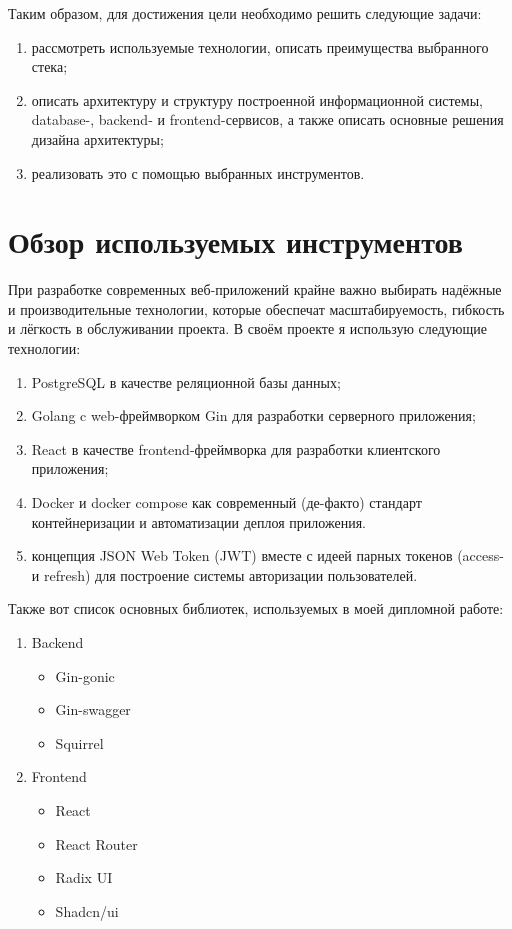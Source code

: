 \documentclass[diploma]{SCWorks}
\begin{document}
Таким образом, для достижения цели необходимо решить следующие задачи:
\begin{enumerate}
    \item рассмотреть используемые технологии, описать преимущества выбранного 
    стека;
    \item описать архитектуру и структуру построенной информационной системы, 
    database-, backend- и frontend-сервисов, а также описать основные решения
    дизайна архитектуры;
    \item реализовать это с помощью выбранных инструментов.
\end{enumerate}

\section{Обзор используемых инструментов}

При разработке современных веб-приложений крайне важно выбирать
надёжные и производительные технологии, которые обеспечат 
масштабируемость, гибкость и лёгкость в обслуживании проекта. 
В своём проекте я использую следующие технологии:
\begin{enumerate}
    \item PostgreSQL в качестве реляционной базы данных;
    \item Golang c web-фреймворком Gin для разработки серверного приложения;
    \item React в качестве frontend-фреймворка для разработки клиентского 
    приложения;
    \item Docker и docker compose как современный (де-факто) стандарт 
    контейнеризации и автоматизации деплоя приложения.
    \item концепция JSON Web Token (JWT) вместе с идеей парных токенов (access-
    и refresh) для построение системы авторизации пользователей.
\end{enumerate}

Также вот список основных библиотек, используемых в моей дипломной работе:
\begin{enumerate}
    \item Backend
    \begin{itemize}
        \item Gin-gonic
        \item Gin-swagger
        \item Squirrel
    \end{itemize}
    \item Frontend
    \begin{itemize}
        \item React
        \item React Router 
        \item Radix UI
        \item Shadcn/ui
    \end{itemize}
\end{enumerate}
\end{document}
